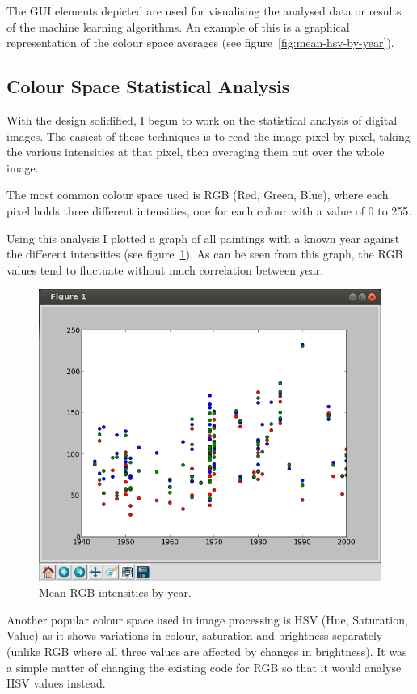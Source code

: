 \documentclass[11pt,fleqn,twoside]{article}
\begin{document}
The GUI elements depicted are used for visualising the analysed data or results of the machine
learning algorithms. An example of this is a graphical representation of the colour space averages
(see figure~\ref{fig:mean-hsv-by-year}).

\subsection{Colour Space Statistical Analysis}
With the design solidified, I begun to work on the statistical analysis of digital images. The 
easiest of these techniques is to read the image pixel by pixel, taking the various intensities at
that pixel, then averaging them out over the whole image.

The most common colour space used is RGB (Red, Green, Blue), where each pixel holds three different
intensities, one for each colour with a value of 0 to 255.

Using this analysis I plotted a graph of all paintings with a known year against the different 
intensities (see figure~\ref{fig:mean-rgb-by-year}). As can be seen from this graph, the RGB values
tend to fluctuate without much correlation between year.

\begin{figure}[p]
\includegraphics[scale=0.5]{img/kyffin-rgp-avg.png}
\caption{Mean RGB intensities by year.}
\label{fig:mean-rgb-by-year}
\end{figure}

Another popular colour space used in image processing is HSV (Hue, Saturation, Value) as it shows
variations in colour, saturation and brightness separately (unlike RGB where all three values are
affected by changes in brightness). It was a simple matter of changing the existing code for RGB
so that it would analyse HSV values instead.
\end{document}
